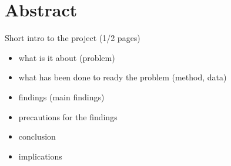 \chapter*{Abstract}

Short intro to the project (1/2 pages)

\begin{itemize}
\item what is it about (problem)
\item what has been done to ready the problem (method, data)
\item findings (main findings)
\item precautions for the findings
\item conclusion
\item implications
\end{itemize}


